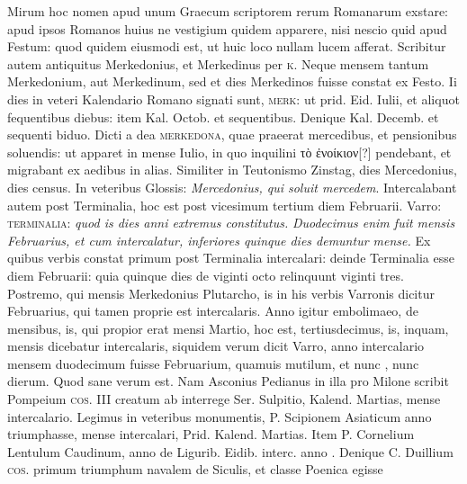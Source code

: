 Mirum hoc nomen apud unum Graecum
scriptorem rerum Romanarum exstare: apud ipsos Romanos huius
ne vestigium quidem apparere, nisi nescio quid apud Festum: quod
quidem eiusmodi est, ut huic loco nullam lucem afferat.
%
Scribitur
autem antiquitus Merkedonius, et Merkedinus per \textsc{k}.
Neque mensem
tantum Merkedonium, aut Merkedinum, sed et dies Merkedinos
fuisse constat ex Festo.
Ii dies in veteri Kalendario Romano
signati sunt, \textsc{merk}: ut prid. Eid. Iulii, %
 et aliquot fequentibus
diebus: item  Kal. Octob. et sequentibus. %
Denique  Kal. %
Decemb. et sequenti biduo. %
Dicti a dea \textsc{merkedona}, quae
praeerat mercedibus, et pensionibus soluendis: ut apparet in mense
Iulio, in quo inquilini \textgreek{τὸ ἐνοίκιον[?]} pendebant,
 et migrabant ex aedibus
in alias.
Similiter in Teutonismo Zinstag, dies Mercedonius,
dies census.
In veteribus Glossis: \textit{Mercedonius, qui soluit mercedem}.
Intercalabant autem post Terminalia, hoc est post vicesimum tertium
diem Februarii.
Varro: \textsc{terminalia}: \textit{quod is dies anni
extremus constitutus.}
\textit{Duodecimus enim fuit mensis Februarius, et
cum intercalatur, inferiores quinque dies demuntur mense.}
Ex quibus
verbis constat primum post Terminalia intercalari: deinde
Terminalia esse  diem Februarii: quia quinque dies de viginti
octo relinquunt viginti tres.
Postremo, qui mensis Merkedonius
Plutarcho, is in his verbis Varronis dicitur Februarius, qui tamen
proprie est intercalaris.
Anno igitur embolimaeo, de 
mensibus, is, qui propior erat mensi Martio, hoc est, tertiusdecimus,
is, inquam, mensis dicebatur intercalaris, siquidem verum
dicit Varro, anno intercalario mensem duodecimum fuisse
Februarium, quamuis mutilum, et nunc , nunc 
dierum.
Quod sane verum est.
Nam Asconius Pedianus in illa
pro Milone scribit Pompeium \textsc{cos. III} creatum ab interrege
Ser. Sulpitio,  Kalend. Martias, mense intercalario. %
Legimus
in veteribus monumentis, P. Scipionem Asiaticum anno  %
triumphasse, mense intercalari, Prid. Kalend. Martias. %
Item P. %
Cornelium Lentulum Caudinum, anno  de Ligurib. %
Eidib. interc. anno . %
Denique C. Duillium \textsc{cos.} primum %
triumphum navalem de Siculis, et classe Poenica egisse
